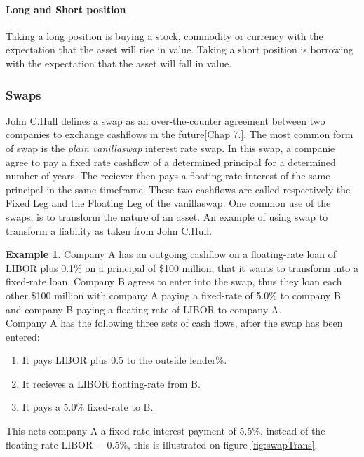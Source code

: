 \documentclass{article}
\theoremstyle{definition}
\newtheorem{exmp}{Example}[section]
\begin{document}
\paragraph{Long and Short position}
Taking a long position is buying a stock, commodity or currency with the expectation that the asset will rise in value.
Taking a short position is borrowing with the expectation that the asset will fall in value\cite{InvOp}.
\subsubsection{Swaps}
John C.Hull defines a swap as an over-the-counter agreement between two companies to exchange cashflows in the future\cite{BOG}[Chap 7.].
The most common form of swap is the \emph{plain vanillaswap} interest rate swap. In this swap, a companie agree to pay a fixed rate
cashflow of a determined principal for a determined number of years. The reciever then pays a floating rate interest of the same principal
in the same timeframe. These two cashflows are called respectively the Fixed Leg and the Floating Leg of the vanillaswap.
One common use of the swaps, is to transform the nature of an asset. 
An example of using swap to transform a liability as taken from John C.Hull\cite{BOG}.
\begin{exmp}
    Company A has an outgoing cashflow on a floating-rate loan of LIBOR plus 0.1\% on a principal of \$100 million, that it wants to transform
    into a fixed-rate loan. 
    Company B agrees to enter into the swap, thus they loan each other \$100 million with company A paying a fixed-rate of 5.0\% to company B
    and company B paying a floating rate of LIBOR to company A.\\
    Company A has the following three sets of cash flows, after the swap has been entered: 
    \begin{enumerate}
        \item It pays LIBOR plus 0.5 to the outside lender\%.
        \item It recieves a LIBOR floating-rate from B.
        \item It pays a 5.0\% fixed-rate to B.
    \end{enumerate}
    This nets company A a fixed-rate interest payment of 5.5\%, instead of the floating-rate LIBOR + 0.5\%, this is illustrated on figure \ref{fig:swapTrans}.
\end{exmp}
\end{document}
